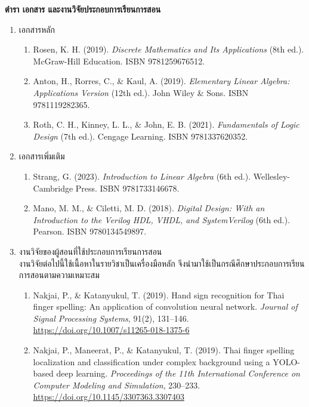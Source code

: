 \noindent
{\small
\setlength{\parskip}{0pt}
\setlength{\itemsep}{0pt}
\textbf{ตำรา เอกสาร และงานวิจัยประกอบการเรียนการสอน}
\begin{enumerate}[topsep=0pt,itemsep=0pt,parsep=0pt]
    \item เอกสารหลัก
    \begin{enumerate}[topsep=0pt,itemsep=0pt,parsep=0pt]
        \item Rosen, K. H. (2019). \textit{Discrete Mathematics and Its Applications} (8th ed.). McGraw-Hill Education. ISBN 9781259676512.
        \item Anton, H., Rorres, C., \& Kaul, A. (2019). \textit{Elementary Linear Algebra: Applications Version} (12th ed.). John Wiley \& Sons. ISBN 9781119282365.
        \item Roth, C. H., Kinney, L. L., \& John, E. B. (2021). \textit{Fundamentals of Logic Design} (7th ed.). Cengage Learning. ISBN 9781337620352.
    \end{enumerate}

    \item เอกสารเพิ่มเติม
    \begin{enumerate}[topsep=0pt,itemsep=0pt,parsep=0pt]
        \item Strang, G. (2023). \textit{Introduction to Linear Algebra} (6th ed.). Wellesley-Cambridge Press. ISBN 9781733146678.
        \item Mano, M. M., \& Ciletti, M. D. (2018). \textit{Digital Design: With an Introduction to the Verilog HDL, VHDL, and SystemVerilog} (6th ed.). Pearson. ISBN 9780134549897.
    \end{enumerate}

    \item งานวิจัยของผู้สอนที่ใช้ประกอบการเรียนการสอน \\
    งานวิจัยต่อไปนี้ใช้เนื้อหาในรายวิชาเป็นเครื่องมือหลัก จึงนำมาใช้เป็นกรณีศึกษาประกอบการเรียนการสอนตามความเหมาะสม
    \begin{enumerate}[topsep=0pt,itemsep=0pt,parsep=0pt]
        \item Nakjai, P., \& Katanyukul, T. (2019). Hand sign recognition for Thai finger spelling:
        An application of convolution neural network. \textit{Journal of Signal Processing Systems},
        91(2), 131--146. \url{https://doi.org/10.1007/s11265-018-1375-6}

        \item Nakjai, P., Maneerat, P., \& Katanyukul, T. (2019). Thai finger spelling localization
        and classification under complex background using a YOLO-based deep learning.
        \textit{Proceedings of the 11th International Conference on Computer Modeling and Simulation}, 230--233.
        \url{https://doi.org/10.1145/3307363.3307403}


\end{enumerate}
\end{enumerate}}
